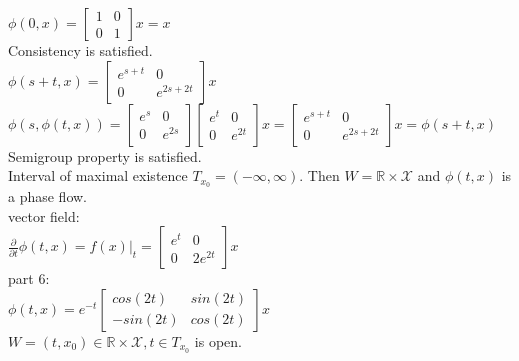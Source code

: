 \documentclass[12pt,letter]{article}
\newcommand{\R}{\mathbb{R}}
\begin{document}
\begin{itemize}
  $\phi(0,x)=\begin{bmatrix}1 & 0 \\ 0 & 1 \end{bmatrix} x = x$\\

  Consistency is satisfied.\\

  $\phi(s+t,x)=
  \begin{bmatrix}e^{s+t} & 0 \\ 0 & e^{2s+2t} \end{bmatrix}
  x$\\
  
  $\phi(s,\phi(t,x))=
  \begin{bmatrix}e^s & 0 \\ 0 & e^{2s} \end{bmatrix}
  \begin{bmatrix}e^t & 0 \\ 0 & e^{2t} \end{bmatrix}
  x=\begin{bmatrix}e^{s+t} & 0 \\ 0 & e^{2s+2t} \end{bmatrix} x = \phi(s+t,x)$\\

  Semigroup property is satisfied.\\

  Interval of maximal existence $T_{x_0}=(-\infty, \infty)$. Then $W=\R \times \mathcal{X}$ and $\phi(t,x)$ is a phase flow.\\

  vector field:\\

  $\frac{\partial}{\partial t} \phi(t,x) = f(x)|_{t}=
  \begin{bmatrix}
    e^{t} & 0\\
    0 & 2e^{2t}
  \end{bmatrix} x $\\
  
  part 6:\\
  
  $\phi(t,x)=e^{-t}\begin{bmatrix}cos(2t) & sin(2t) \\ -sin(2t) & cos(2t) \end{bmatrix} x$\\

  $W={(t,x_0) \in \R \times \mathcal{X}, t \in T_{x_0} }$ is open.\\
  

\end{itemize}
\end{document}
